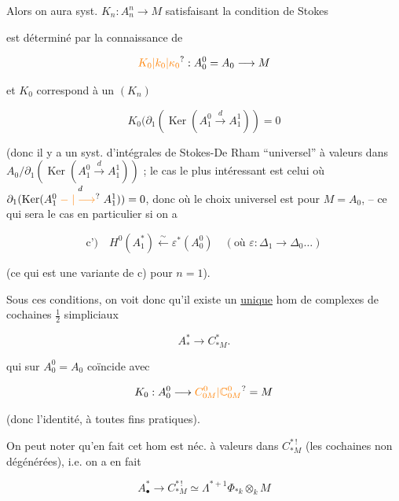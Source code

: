 Alors on aura  syst. $K_n:A_n^n\longrightarrow M$ satisfaisant la condition de Stokes


est déterminé par la connaissance de

\[
\unsure{K_0|k_0|\kappa_0}:A^0_0=A_0\longrightarrow M
\]

et $K_0$ correspond à un $(K_n)$ 

\[
K_0(\partial_1(\operatorname{Ker}(A^0_1\xrightarrow{d}A^1_1))=0
\]

(donc il y a un syst. d'intégrales de Stokes-De Rham ``universel'' à valeurs dans $A_0/\partial_1(\operatorname{Ker}(A_1^0\xrightarrow{d}A_1^1))$ ; le cas le plus intéressant est celui où $\partial_1(\operatorname{Ker}(A_1^0\mathrel{\overset{d}{\unsure{\relbar|\longrightarrow}}}A_1^1))=0$, donc où le choix universel est pour $M=A_0$, -- ce qui sera le cas en particulier si on a

\[
\text{c')}\quad H^0(A^*_1)\xleftarrow{\sim}\varepsilon^*(A_0^0)\quad(\text{où }\varepsilon:\Delta_1\to\Delta_0\ldots)
\]


(ce qui est une variante de c) pour $n=1$).

Sous ces conditions, on voit donc qu'il existe un \uline{unique} hom de complexes de cochaines $\frac{1}{2}$ simpliciaux

\[
A^*_{*}\longrightarrow C^*_{*M}.
\]

qui sur $A_0^0=A_0$ coïncide avec

\[
K_0:A_0^0\longrightarrow \unsure{C^0_{0M}|\mathbb C^0_{0M}}=M
\]

(donc l'identité, à toutes fins pratiques).

On peut noter qu'en fait cet hom est néc. à valeurs dans $C^{*\,!}_{*M}$ (les cochaines non dégénérées), i.e. on a en fait

\[
A^*_\bullet\longrightarrow C^{*\,!}_{*M}\simeq\Lambda^{*+1}\Phi_{*k}\otimes_k M
\]

